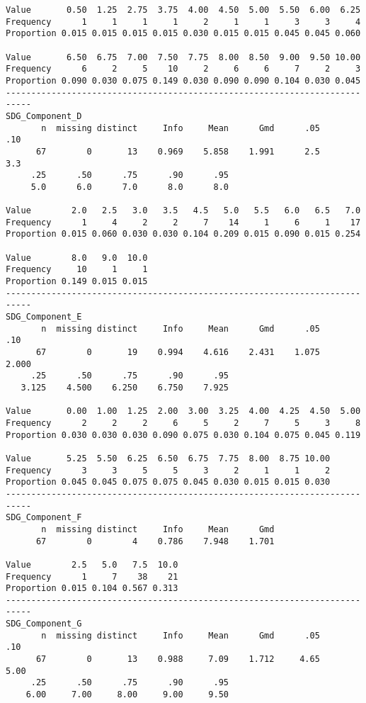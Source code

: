 \documentclass[]{article}
\begin{document}
\begin{verbatim}
Value       0.50  1.25  2.75  3.75  4.00  4.50  5.00  5.50  6.00  6.25
Frequency      1     1     1     1     2     1     1     3     3     4
Proportion 0.015 0.015 0.015 0.015 0.030 0.015 0.015 0.045 0.045 0.060
                                                                      
Value       6.50  6.75  7.00  7.50  7.75  8.00  8.50  9.00  9.50 10.00
Frequency      6     2     5    10     2     6     6     7     2     3
Proportion 0.090 0.030 0.075 0.149 0.030 0.090 0.090 0.104 0.030 0.045
---------------------------------------------------------------------------
SDG_Component_D 
       n  missing distinct     Info     Mean      Gmd      .05      .10 
      67        0       13    0.969    5.858    1.991      2.5      3.3 
     .25      .50      .75      .90      .95 
     5.0      6.0      7.0      8.0      8.0 
                                                                      
Value        2.0   2.5   3.0   3.5   4.5   5.0   5.5   6.0   6.5   7.0
Frequency      1     4     2     2     7    14     1     6     1    17
Proportion 0.015 0.060 0.030 0.030 0.104 0.209 0.015 0.090 0.015 0.254
                            
Value        8.0   9.0  10.0
Frequency     10     1     1
Proportion 0.149 0.015 0.015
---------------------------------------------------------------------------
SDG_Component_E 
       n  missing distinct     Info     Mean      Gmd      .05      .10 
      67        0       19    0.994    4.616    2.431    1.075    2.000 
     .25      .50      .75      .90      .95 
   3.125    4.500    6.250    6.750    7.925 
                                                                      
Value       0.00  1.00  1.25  2.00  3.00  3.25  4.00  4.25  4.50  5.00
Frequency      2     2     2     6     5     2     7     5     3     8
Proportion 0.030 0.030 0.030 0.090 0.075 0.030 0.104 0.075 0.045 0.119
                                                                
Value       5.25  5.50  6.25  6.50  6.75  7.75  8.00  8.75 10.00
Frequency      3     3     5     5     3     2     1     1     2
Proportion 0.045 0.045 0.075 0.075 0.045 0.030 0.015 0.015 0.030
---------------------------------------------------------------------------
SDG_Component_F 
       n  missing distinct     Info     Mean      Gmd 
      67        0        4    0.786    7.948    1.701 
                                  
Value        2.5   5.0   7.5  10.0
Frequency      1     7    38    21
Proportion 0.015 0.104 0.567 0.313
---------------------------------------------------------------------------
SDG_Component_G 
       n  missing distinct     Info     Mean      Gmd      .05      .10 
      67        0       13    0.988     7.09    1.712     4.65     5.00 
     .25      .50      .75      .90      .95 
    6.00     7.00     8.00     9.00     9.50 
                                                                      

\end{verbatim}
\end{document}

